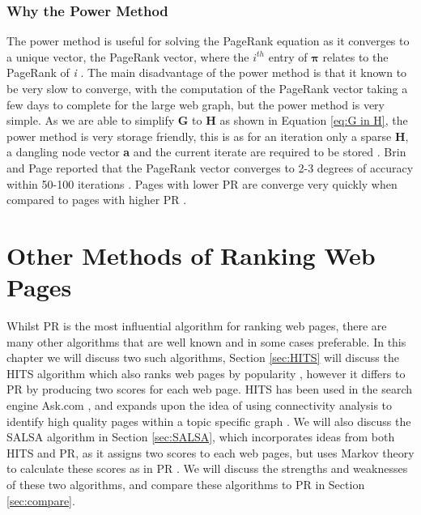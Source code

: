 \documentclass[11pt]{report}
\begin{document}
\subsection{Why the Power Method}\label{sec:why power}

The power method is useful for solving the PageRank equation as it converges to a unique vector, the PageRank vector, where the $i^{th}$ entry of $\boldsymbol\pi$ relates to the PageRank of \textit{i} \cite{ipsen2005analysis}. The main disadvantage of the power method is that it known to be very slow to converge, with the computation of the PageRank vector taking a few days to complete for the large web graph, but the power method is very simple. As we are able to simplify \textbf{G} to \textbf{H} as shown in Equation \eqref{eq:G in H}, the power method is very storage friendly, this is as for an iteration only a sparse \textbf{H}, a dangling node vector \textbf{a} and the current iterate are required to be stored \cite{langville}. Brin and Page reported that the PageRank vector converges to 2-3 degrees of accuracy within 50-100 iterations \cite{austin}. Pages with lower PR are converge very quickly when compared to pages with higher PR \cite{thorson2004modeling}.


\chapter{Other Methods of Ranking Web Pages}\label{chap:Other}


Whilst PR is the most influential algorithm for ranking web pages, there are many other algorithms that are well known and in some cases preferable. In this chapter we will discuss two such algorithms, Section \ref{sec:HITS} will discuss the HITS algorithm which also ranks web pages by popularity \cite{kleinberg1999authoritative}, however it differs to PR by producing two scores for each web page. HITS has been used in the search engine Ask.com \cite{bonato}, and expands upon the idea of using connectivity analysis to identify high quality pages within a topic specific graph \cite{manning}. We will also discuss the SALSA algorithm in Section \ref{sec:SALSA}, which incorporates ideas from both HITS and PR, as it assigns two scores to each web pages, but uses Markov theory to calculate these scores as in PR \cite{lempel2000stochastic}. We will discuss the strengths and weaknesses of these two algorithms, and compare these algorithms to PR in Section \ref{sec:compare}.
\end{document}
